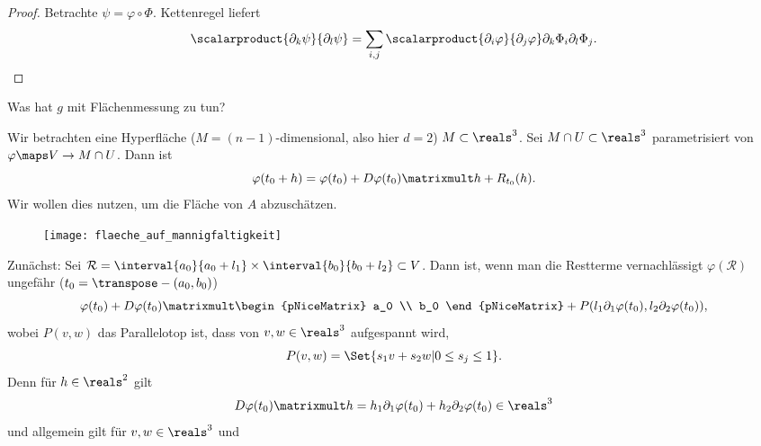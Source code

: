 \begin{proof}
  Betrachte \( \psi=\varphi\circ \Phi \). Kettenregel liefert
  \begin{equation*}
    \scalarproduct{\partial_k \psi}{\partial_l \psi}=\sum_{i,j}\scalarproduct{\partial_i \varphi}{\partial_j \varphi}\partial_k \Phi_i\partial_l \Phi_j.
  \end{equation*}
\end{proof}
\begin{frage}
  Was hat \( g \) mit Flächenmessung zu tun?
  \begin{eigenschaftenenumerate}
    \item Wir betrachten eine Hyperfläche
     (\( M=(n-1) \)-dimensional,
      also hier \( d=2 \)) 
      \( M\subset \reals^3\).
       Sei \( M\cap U\subset \reals^3 \) parametrisiert von 
       \( \varphi\maps V\to M\cap U \). Dann ist
    \begin{equation*}
      \varphi(t_0+h)=\varphi(t_0)+D\varphi(t_0)\matrixmult h+R_{t_0}(h).
    \end{equation*}
    Wir wollen dies nutzen, um die Fläche von \( A \) abzuschätzen.
    \begin{figure}[H]
      \centering
      \texttt{[image: flaeche\_auf\_mannigfaltigkeit]}
      \label{fig:flaeche_auf_mannigfaltigkeit}
    \end{figure}
    \item Zunächst: Sei \( \mathcal{R}=\interval{a_0}{a_0+l_1}\times \interval{b_0}{b_0+l_2}\subset V \). Dann ist, wenn man die Restterme vernachlässigt \( \varphi(\mathcal{R}) \) ungefähr (\( t_0=\transpose-{(a_0,b_0)} \))
    \begin{equation*}
      \varphi(t_0)+D\varphi(t_0)\matrixmult \begin{pNiceMatrix} a_0 \\ b_0 \end{pNiceMatrix}+P(l_1 \partial_1 \varphi(t_0),l_2 \partial_2 \varphi(t_0)),
    \end{equation*}
    wobei \( P(v,w) \) das Parallelotop ist, dass von \( v,w\in \reals^3 \) aufgespannt wird,
    \begin{equation*}
      P(v,w)=\Set{s_1 v+s_2 w|0\leq s_j\leq 1}.
    \end{equation*}
    Denn für \( h\in \reals^2 \) gilt
    \begin{equation*}
      D\varphi(t_0)\matrixmult h=h_1 \partial_1 \varphi(t_0)+h_2 \partial_2 \varphi(t_0)\in \reals^3
    \end{equation*}
    und allgemein gilt für \( v ,w \in \reals^3\) und

\end{eigenschaftenenumerate}
\end{frage}
